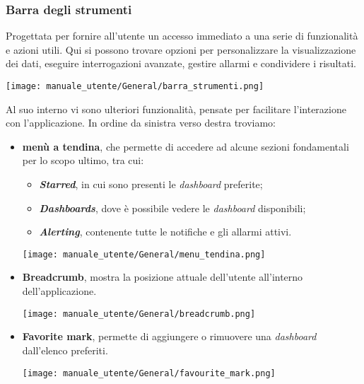 \subsubsection{Barra degli strumenti}
Progettata per fornire all'utente un accesso immediato a una serie di funzionalità e azioni utili. Qui si possono trovare opzioni per personalizzare la visualizzazione dei dati, eseguire interrogazioni avanzate, gestire allarmi e condividere i risultati.
\begin{center}
    \texttt{[image: manuale\_utente/General/barra\_strumenti.png]}
\end{center}
Al suo interno vi sono ulteriori funzionalità, pensate per facilitare l'interazione con l'applicazione. In ordine da sinistra verso destra troviamo:
\begin{itemize}
    \item \textbf{menù a tendina}, che permette di accedere ad alcune sezioni fondamentali per lo scopo ultimo, tra cui:
        \begin{itemize}
            \item \textbf{\textit{Starred}}, in cui sono presenti le \textit{dashboard} preferite;
            \item \textbf{\textit{Dashboards}}, dove è possibile vedere le \textit{dashboard} disponibili;
            \item \textbf{\textit{Alerting}}, contenente tutte le notifiche e gli allarmi attivi.
        \end{itemize}
        \begin{center}
            \texttt{[image: manuale\_utente/General/menu\_tendina.png]}
        \end{center}
    \item \textbf{Breadcrumb}, mostra la posizione attuale dell'utente all'interno dell'applicazione.
        \begin{center}
            \texttt{[image: manuale\_utente/General/breadcrumb.png]}
        \end{center}
    \item \textbf{Favorite mark}, permette di aggiungere o rimuovere una \textit{dashboard} dall'elenco preferiti.
        \begin{center}
            \texttt{[image: manuale\_utente/General/favourite\_mark.png]}

\end{center}
\end{itemize}
